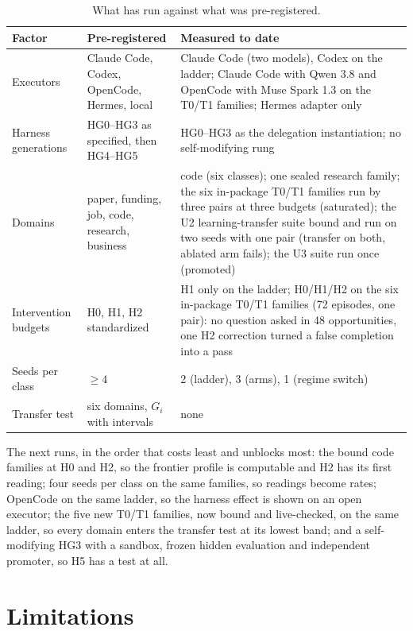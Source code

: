 \documentclass[11pt]{article}
\theoremstyle{definition}
\begin{document}
\begin{table}[!htbp]
\centering\small
\begin{tabularx}{\textwidth}{@{}lYY@{}}
\toprule
Factor & Pre-registered & Measured to date \\
\midrule
Executors & Claude Code, Codex, OpenCode, Hermes, local & Claude Code (two models), Codex on the ladder; Claude Code with Qwen 3.8 and OpenCode with Muse Spark 1.3 on the T0/T1 families; Hermes adapter only \\
Harness generations & HG0--HG3 as specified, then HG4--HG5 & HG0--HG3 as the delegation instantiation; no self-modifying rung \\
Domains & paper, funding, job, code, research, business & code (six classes); one sealed research family; the six in-package T0/T1 families run by three pairs at three budgets (saturated); the U2 learning-transfer suite bound and run on two seeds with one pair (transfer on both, ablated arm fails); the U3 suite run once (promoted) \\
Intervention budgets & H0, H1, H2 standardized & H1 only on the ladder; H0/H1/H2 on the six in-package T0/T1 families (72 episodes, one pair): no question asked in 48 opportunities, one H2 correction turned a false completion into a pass \\
Seeds per class & $\ge 4$ & 2 (ladder), 3 (arms), 1 (regime switch) \\
Transfer test & six domains, $G_i$ with intervals & none \\
\bottomrule
\end{tabularx}
\caption{What has run against what was pre-registered.}
\label{tab:coverage}
\end{table}

The next runs, in the order that costs least and unblocks most: the bound code families at H0 and H2, so the frontier profile is computable and H2 has its first reading; four seeds per class on the same families, so readings become rates; OpenCode on the same ladder, so the harness effect is shown on an open executor; the five new T0/T1 families, now bound and live-checked, on the same ladder, so every domain enters the transfer test at its lowest band; and a self-modifying HG3 with a sandbox, frozen hidden evaluation and independent promoter, so H5 has a test at all.

\section{Limitations}\label{sec:limits}
\end{document}
